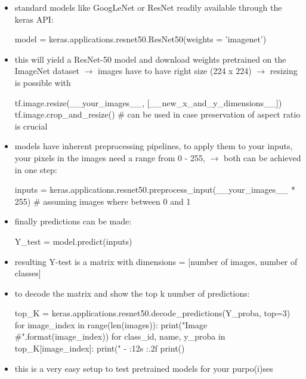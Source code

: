 \documentclass[12pt,a4paper]{article}
\begin{document}
\begin{itemize}
  \item standard models like GoogLeNet or ResNet readily available through the keras API:
  \begin{python}
    model = keras.applications.resnet50.ResNet50(weights = 'imagenet')
  \end{python}
  \item this will yield a ResNet-50 model and download weights pretrained on the ImageNet dataset
  \newline \indent $\longrightarrow$ images have to have right size (224 x 224)
  \newline \indent $\longrightarrow$ resizing is possible with \begin{python}
    tf.image.resize(__your_images__, [__new_x_and_y_dimensions__])
    tf.image.crop_and_resize() # can be used in case preservation of aspect ratio is crucial
  \end{python}
  \item models have inherent preprocessing pipelines, to apply them to your inputs, your pixels in the images need a range from 0 - 255, 
  \newline \indent $\longrightarrow$ both can be achieved in one step:
  \begin{python}
    inputs = keras.applications.resnet50.preprocess_input(__your_images__ * 255) # assuming images where between 0 and 1
  \end{python}
  \item finally predictions can be made:
  \begin{python}
    Y_test = model.predict(inputs)
  \end{python}
  \item resulting Y-test is a matrix with dimensions = [number of images, number of classes]
  \item to decode the matrix and show the top k number of predictions:
  \begin{python}
    top_K = keras.applications.resnet50.decode_predictions(Y_proba, top=3)
    for image_index in range(len(images)):
        print("Image #{}".format(image_index))
        for class_id, name, y_proba in top_K[image_index]:
            print(" {} - {:12s} {:.2f}%
        print()
  \end{python}
  \item this is a very easy setup to test pretrained models for your purpo(i)ses
\end{itemize}
\end{document}
